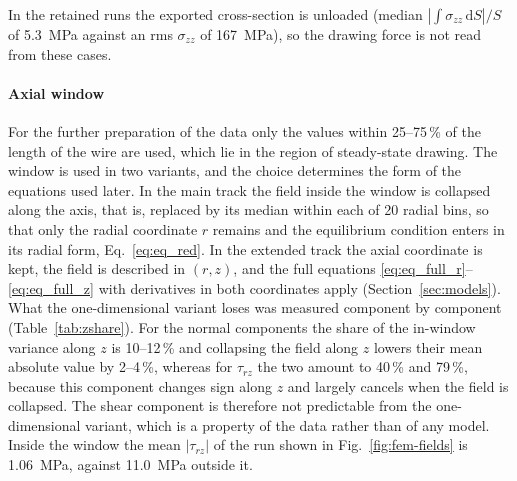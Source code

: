 \documentclass[subscriptcorrection,upint,varvw,barcolor=Goldenrod3,mathalfa=cal=euler,balance,hyphenate,french,pdf-a]{asmejour} %
\begin{document}
In the retained runs the exported cross-section is unloaded (median $|\int\sigma_{zz}\,\mathrm{d}S|/S$ of 5.3~MPa against an rms $\sigma_{zz}$ of 167~MPa), so the drawing force is not read from these cases. %

\paragraph{Axial window}
For the further preparation of the data only the values within 25--75\,\% of the length of the wire are used, which lie in the region of steady-state drawing. %
The window is used in two variants, and the choice determines the form of the equations used later. In the main track the field inside the window is collapsed along the axis, that is, replaced by its median within each of 20 radial bins, so that only the radial coordinate $r$ remains and the equilibrium condition enters in its radial form, Eq.~\eqref{eq:eq_red}. In the extended track the axial coordinate is kept, the field is described in $(r,z)$, and the full equations \eqref{eq:eq_full_r}--\eqref{eq:eq_full_z} with derivatives in both coordinates apply (Section~\ref{sec:models}). What the one-dimensional variant loses was measured component by component (Table~\ref{tab:zshare}). For the normal components the share of the in-window variance along $z$ is 10--12\,\% and collapsing the field along $z$ lowers their mean absolute value by 2--4\,\%, whereas for $\tau_{rz}$ the two amount to 40\,\% and 79\,\%, because this component changes sign along $z$ and largely cancels when the field is collapsed. %
The shear component is therefore not predictable from the one-dimensional variant, which is a property of the data rather than of any model. Inside the window the mean $|\tau_{rz}|$ of the run shown in Fig.~\ref{fig:fem-fields} is 1.06~MPa, against 11.0~MPa outside it. %
\end{document}
